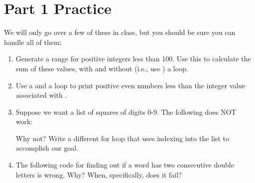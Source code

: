 \documentclass[letterpaper,10pt,english]{sphinxmanual}
\begin{document}
\section{Part 1 Practice}
\label{\detokenize{lecture_notes/lec12_loops2_for_double:part-1-practice}}
We will only go over a few of these in class, but you should be sure
you can handle all of them:
\begin{enumerate}
\def\theenumi{\arabic{enumi}}
\def\labelenumi{\theenumi .}
\makeatletter\def\p@enumii{\p@enumi \theenumi .}\makeatother
\item {} 
Generate a range for positive integers less than 100. Use this to
calculate the sum of these values, with and without (i.e., use
) a  loop.

\item {} 
Use a  and a  loop to print positive even numbers less than the
integer value associated with .

\item {} 
Suppose we want a list of squares of digits 0-9. The
following does NOT work:

\begin{sphinxVerbatim}[commandchars=\\\{\}]
  
   
        
\end{sphinxVerbatim}

Why not? Write a different for loop that uses indexing into the
 list to accomplish our goal.

\item {} 
The following code for finding out if a word has two consecutive
double letters is wrong. Why? When, specifically, does it fail?

\begin{sphinxVerbatim}[commandchars=\\\{\}]
 
          
         \PYG{p}{[}\PYG{p}{]}  \PYG{p}{[}  \PYG{p}{]}  \PYG{p}{[}  \PYG{p}{]}  \PYG{p}{[}  \PYG{p}{]}
             
     
\end{sphinxVerbatim}

\end{enumerate}
\end{document}
